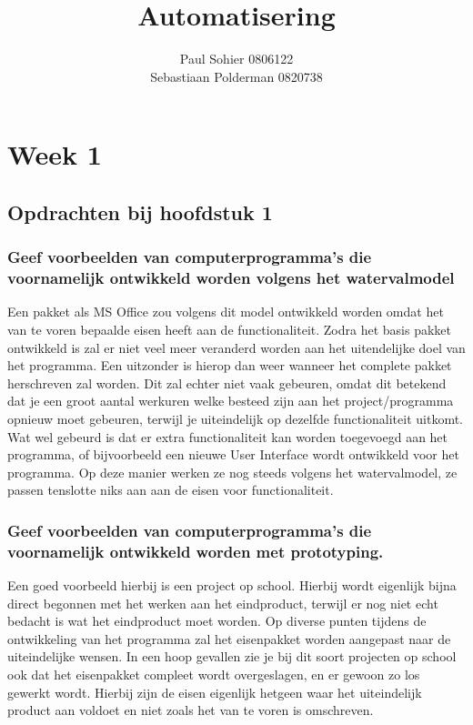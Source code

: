\documentclass[a4paper,titlepage]{artikel1}
\author{Paul Sohier 0806122\\Sebastiaan Polderman 0820738}
\title{Automatisering}
\begin{document}
\maketitle
\tableofcontents
\newpage
 \section{Week 1}
  \subsection{Opdrachten bij hoofdstuk 1}
   \subsubsection[Opdracht 1]{Geef voorbeelden van computerprogramma's die voornamelijk ontwikkeld worden volgens het watervalmodel}
   Een pakket als MS Office zou volgens dit model ontwikkeld worden omdat het van te voren bepaalde eisen heeft aan de functionaliteit. 
   Zodra het basis pakket ontwikkeld is zal er niet veel meer veranderd worden aan het uitendelijke doel van het programma. Een uitzonder is hierop dan weer wanneer het complete pakket herschreven zal worden. Dit zal echter niet vaak gebeuren, omdat dit betekend dat je een groot aantal werkuren welke besteed zijn aan het project/programma opnieuw moet gebeuren, terwijl je uiteindelijk op dezelfde functionaliteit uitkomt. Wat wel gebeurd is dat er extra functionaliteit kan worden toegevoegd aan het programma, of bijvoorbeeld een nieuwe User Interface wordt ontwikkeld voor het programma. Op deze manier werken ze nog steeds volgens het watervalmodel, ze passen tenslotte niks aan aan de eisen voor functionaliteit.
   
   \subsubsection[Opdracht 2]{Geef voorbeelden van computerprogramma's die voornamelijk ontwikkeld worden met prototyping.}
   Een goed voorbeeld hierbij is een project op school. Hierbij wordt eigenlijk bijna direct begonnen met het werken aan het eindproduct, terwijl er nog niet echt bedacht is wat het eindproduct moet worden. Op diverse punten tijdens de ontwikkeling van het programma zal het eisenpakket worden aangepast naar de uiteindelijke wensen. In een hoop gevallen zie je bij dit soort projecten op school ook dat het eisenpakket compleet wordt overgeslagen, en er gewoon zo los gewerkt wordt. Hierbij zijn de eisen eigenlijk hetgeen waar het uiteindelijk product aan voldoet en niet zoals het van te voren is omschreven. 
   
\end{document}
